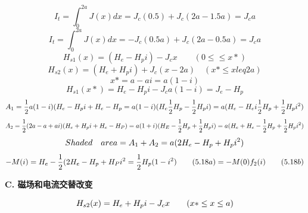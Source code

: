 \begin{equation}%
I_{t}=\int_{0}^{2a}J(x)dx=J_{c}(0.5)+J_{c}(2a-1.5a)=J_{c}a
\end{equation}
\begin{equation}%
I_{t}=\int_{0}^{2a}J(x)dx=-J_{c}(0.5a)+J_{c}(2a-0.5a)=J_{c}a
\end{equation}
\begin{equation}%
H_{s1}(x)=(H_{e}-H_{p}i)-J_{c}x\qquad(0\leq \leq x*)
\end{equation}
\begin{equation}%
H_{s2}(x)=(H_{e}+H_{p}i)+J_{c}(x-2a)\quad(x*\leq x leq  2a)
\end{equation}
\begin{equation}%
x*=a-ai=a(1-i)
\end{equation}
\begin{equation}%
H_{s1}(x*)=H_{e}-H_{p}i-J_{c}a(1-i)=J_{e}-H_{p}
\end{equation}
\begin{equation}%
A_{1}=\frac{1}{2}a(1-i)(H_{e}-H_{p}i+H_{e}-H_{p}\\
=a(1-i)(H_{e}\frac{1}{2}H_{p}-\frac{1}{2}H_{p}i)\\
=a(H_{e}-H_{e}i\frac{1}{2}H_{p}+\frac{1}{2}H_{p}i^{2})
\end{equation}
\begin{equation}%
A_{2}=\frac{1}{2}(2a-a+ai)(H_{e}+H_{p}i+H_{e}-H_{P})\\
=a(1+i)(H_E-\frac{1}{2}H_{p}+\frac{1}{2}H_{p}i)\\
=a(H_{e}+H_{e}-\frac{1}{2}H_{p}+\frac{1}{2}H_{p}i^{2})
\end{equation}
\begin{equation}%
Shaded\quad area=A_{1}+A_{2}\\
=a(2H_{e}-H_{p}+H_{p}i^{2})
\end{equation}
\begin{equation}%
-M(i)=H_{e}-\frac{1}{2}(2H_{e}-H_{p}+H_{P}i^{2}\\
=\frac{1}{2}H_{p}(1-i^{2})\qquad(5.18a)\\
=-M(0)f_{2}(i)\qquad(5.18b)
\end{equation}


\textbf{C. 磁场和电流交替改变}

\begin{equation}%
H_{s2}(x)=H_{e}+H_{p}i-J_{c}x\qquad(x*\leq x\leq a)\\
\end{equation}

